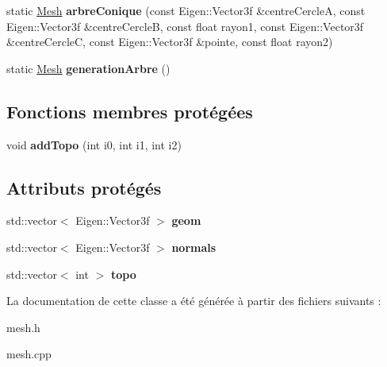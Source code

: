\begin{DoxyCompactItemize}
\item 
\hypertarget{class_mesh_a5006a9bdbbb9e7675b2f309ef5c23ab2}{}static \hyperlink{class_mesh}{Mesh} {\bfseries arbre\+Conique} (const Eigen\+::\+Vector3f \&centre\+Cercle\+A, const Eigen\+::\+Vector3f \&centre\+Cercle\+B, const float rayon1, const Eigen\+::\+Vector3f \&centre\+Cercle\+C, const Eigen\+::\+Vector3f \&pointe, const float rayon2)\label{class_mesh_a5006a9bdbbb9e7675b2f309ef5c23ab2}

\item 
\hypertarget{class_mesh_a9f879433df5f8264105d832f37d47e9f}{}static \hyperlink{class_mesh}{Mesh} {\bfseries generation\+Arbre} ()\label{class_mesh_a9f879433df5f8264105d832f37d47e9f}

\end{DoxyCompactItemize}
\subsection*{Fonctions membres protégées}
\begin{DoxyCompactItemize}
\item 
\hypertarget{class_mesh_aa671274e8450902dd8f08f6efae18589}{}void {\bfseries add\+Topo} (int i0, int i1, int i2)\label{class_mesh_aa671274e8450902dd8f08f6efae18589}

\end{DoxyCompactItemize}
\subsection*{Attributs protégés}
\begin{DoxyCompactItemize}
\item 
\hypertarget{class_mesh_a1560e73fd9881dc165885de0aadfcdc2}{}std\+::vector$<$ Eigen\+::\+Vector3f $>$ {\bfseries geom}\label{class_mesh_a1560e73fd9881dc165885de0aadfcdc2}

\item 
\hypertarget{class_mesh_a60a26361cda69b5195de60133f713826}{}std\+::vector$<$ Eigen\+::\+Vector3f $>$ {\bfseries normals}\label{class_mesh_a60a26361cda69b5195de60133f713826}

\item 
\hypertarget{class_mesh_a98e6ea69c9c4d5c60a5eced9dbac5147}{}std\+::vector$<$ int $>$ {\bfseries topo}\label{class_mesh_a98e6ea69c9c4d5c60a5eced9dbac5147}

\end{DoxyCompactItemize}


La documentation de cette classe a été générée à partir des fichiers suivants \+:\begin{DoxyCompactItemize}
\item 
mesh.\+h\item 
mesh.\+cpp\end{DoxyCompactItemize}
